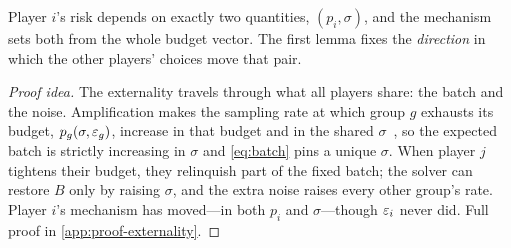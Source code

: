 Player $i$'s risk depends on exactly two quantities, $(p_i, \sigma)$,
and the mechanism sets both from the whole budget vector. The first
lemma fixes the \emph{direction} in which the other players' choices
move that pair.


\begin{proof}[Proof idea]
The externality travels through what all players share: the batch
and the noise. Amplification makes the sampling rate at which group
$g$ exhausts its budget, $p_g(\sigma, \varepsilon_g)$, increase in that
budget and in the shared $\sigma$~\cite{balle2020privacy}, so the
expected batch is strictly increasing in $\sigma$ and \eqref{eq:batch} pins
a unique $\sigma$. When player $j$ tightens their budget, they
relinquish part of the fixed batch; the solver can restore $B$ only
by raising $\sigma$, and the extra noise raises every other group's
rate. Player $i$'s mechanism has moved---in both $p_i$ and
$\sigma$---though $\varepsilon_i$ never did. Full proof in
\cref{app:proof-externality}.
\end{proof}

